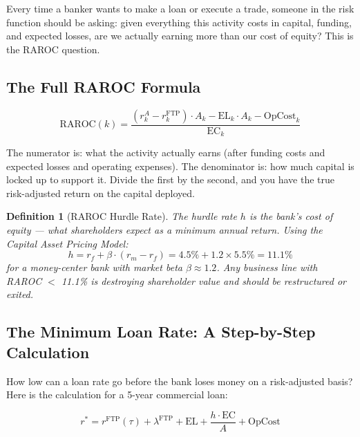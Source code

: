 \documentclass[12pt,a4paper]{article}
\newtheorem{definition}{Definition}
\begin{document}
Every time a banker wants to make a loan or execute a trade, someone in the
risk function should be asking: given everything this activity costs in
capital, funding, and expected losses, are we actually earning more than our
cost of equity?  This is the RAROC question.

\subsection{The Full RAROC Formula}

\begin{equation}
  \text{RAROC}(k) =
  \frac{(r_k^A - r_k^{\text{FTP}}) \cdot A_k - \text{EL}_k \cdot A_k - \text{OpCost}_k}
       {\text{EC}_k}
\end{equation}

\begin{mdframed}[style=plainenglish]
The numerator is: what the activity actually earns (after funding costs and
expected losses and operating expenses).  The denominator is: how much capital
is locked up to support it.  Divide the first by the second, and you have the
true risk-adjusted return on the capital deployed.
\end{mdframed}

\begin{definition}[RAROC Hurdle Rate]
The hurdle rate $h$ is the bank's cost of equity --- what shareholders expect
as a minimum annual return.  Using the Capital Asset Pricing Model:
\begin{equation}
  h = r_f + \beta \cdot (r_m - r_f) = 4.5\% + 1.2 \times 5.5\% = 11.1\%
\end{equation}
for a money-center bank with market beta $\beta \approx 1.2$.
Any business line with RAROC $<$ 11.1\% is destroying shareholder value and
should be restructured or exited.
\end{definition}

\subsection{The Minimum Loan Rate: A Step-by-Step Calculation}

How low can a loan rate go before the bank loses money on a risk-adjusted
basis?  Here is the calculation for a 5-year commercial loan:

\begin{equation}
  r^* = r^{\text{FTP}}(\tau) + \lambda^{\text{FTP}} + \text{EL} + \frac{h \cdot \text{EC}}{A}
      + \text{OpCost}
\end{equation}
\end{document}
